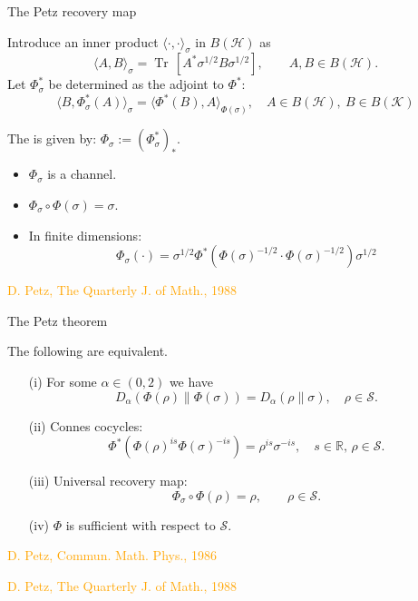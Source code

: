 \documentclass[mathserif]{beamer}
\newcommand{\<}{\langle}
\renewcommand{\>}{\rangle}
\newcommand{\Tr}{\operatorname{Tr}\,}
\newcommand{\Se}{\mathcal S}
\newcommand{\Ha}{\mathcal H}
\newcommand{\Ka}{\mathcal K}
\begin{document}
\begin{frame}{The Petz recovery map}


Introduce an inner product $\<\cdot,\cdot\>_\sigma$ in $B(\Ha)$ as
\[
\<A,B\>_\sigma=\Tr[A^*\sigma^{1/2}B\sigma^{1/2}],\qquad A,B\in B(\Ha).
\]
Let $\Phi^*_\sigma$ be determined as the adjoint to $\Phi^*$:
\[
\<B, \Phi^*_\sigma(A)\>_\sigma=\<\Phi^*(B),A\>_{\Phi(\sigma)},\quad  A\in B(\Ha),\ B\in B(\Ka)
\]

The  is given by: $\Phi_\sigma:= (\Phi_\sigma^*)_*$.

\begin{itemize}
\item $\Phi_\sigma$ is a channel.
\item $\Phi_\sigma\circ \Phi(\sigma)=\sigma$.
\item In finite dimensions:
\[
\Phi_\sigma(\cdot)=
\sigma^{1/2}\Phi^*(\Phi(\sigma)^{
-1/2}\cdot \Phi(\sigma)^{-1/2})\sigma^{1/2}
\]


\end{itemize}

\vfill
{\footnotesize \textcolor{orange}{ D. Petz, The Quarterly J. of Math., 1988}}
\end{frame}

\begin{frame}{The Petz theorem}

The following are equivalent.
\medskip

\begin{enumerate}
\item[(i)] For some $\alpha\in (0,2)$ we have
\[
D_\alpha(\Phi(\rho)\|\Phi(\sigma))=D_\alpha(\rho\|\sigma),\quad  \rho\in \Se.
\]
\item[(ii)] Connes cocycles:
\[
\Phi^*(\Phi(\rho)^{is}\Phi(\sigma)^{-is})=\rho^{is}\sigma^{-is},\quad  
s\in \mathbb R, \, \rho\in \Se.
\]

\item[(iii)] Universal recovery map:
\[
\Phi_\sigma\circ \Phi(\rho)=\rho,\qquad \rho\in \Se.
\]

\item[(iv)] $\Phi$ is sufficient with respect to $\Se$.
\end{enumerate}


\vfill
{\footnotesize \textcolor{orange}{ D. Petz, Commun. Math. Phys., 1986}

\textcolor{orange}{ D. Petz, The Quarterly J. of Math., 1988}
}



\end{frame}
\end{document}
